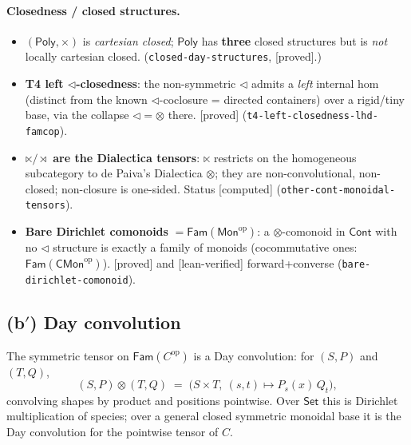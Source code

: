 \documentclass[11pt]{article}
\newcommand{\Cont}{\mathsf{Cont}}
\newcommand{\Poly}{\mathsf{Poly}}
\newcommand{\Fam}{\mathsf{Fam}}
\newcommand{\Set}{\mathsf{Set}}
\newcommand{\reg}[1]{\texttt{#1}}
\newcommand{\grade}[1]{\textsf{[#1]}}
\begin{document}
\paragraph{Closedness / closed structures.}
\begin{itemize}[leftmargin=1.2em]
\item $(\Poly,\times)$ is \emph{cartesian closed}; $\Poly$ has \textbf{three} closed
structures but is \emph{not} locally cartesian closed. (\reg{closed-day-structures},
\grade{proved}.)
\item \textbf{T4 left $\lhd$-closedness}: the non-symmetric $\lhd$ admits a \emph{left}
internal hom (distinct from the known $\lhd$-coclosure = directed containers) over a
rigid/tiny base, via the collapse $\lhd=\otimes$ there. \grade{proved}
(\reg{t4-left-closedness-lhd-famcop}).
\item \textbf{$\ltimes/\rtimes$ are the Dialectica tensors}: $\ltimes$ restricts on the
homogeneous subcategory to de Paiva's Dialectica $\otimes$; they are non-convolutional,
non-closed; non-closure is one-sided. Status \grade{computed}
(\reg{other-cont-monoidal-tensors}).
\item \textbf{Bare Dirichlet comonoids} $=\Fam(\mathsf{Mon}^{\mathrm{op}})$: a
$\otimes$-comonoid in $\Cont$ with no $\lhd$ structure is exactly a family of monoids
(cocommutative ones: $\Fam(\mathsf{CMon}^{\mathrm{op}})$). \grade{proved} and
\grade{lean-verified} forward+converse (\reg{bare-dirichlet-comonoid}).
\end{itemize}

\subsection{(b$'$) Day convolution}\label{sec:day}

The symmetric tensor on $\Fam(C^{\mathrm{op}})$ is a Day convolution: for
$(S,P)$ and $(T,Q)$,
\[
(S,P)\otimes(T,Q) \;=\; \bigl(S\times T,\ (s,t)\mapsto P_s(x)\,Q_t\bigr),
\]
convolving shapes by product and positions pointwise. Over $\Set$ this is Dirichlet
multiplication of species; over a general closed symmetric monoidal base it is the Day
convolution for the pointwise tensor of $C$.
\end{document}
